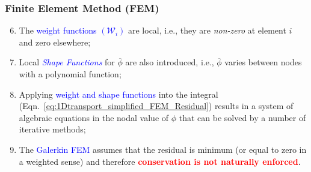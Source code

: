 \documentclass[10pt,compress,handout,ignorenonframetext]{beamer}
\begin{document}
 
\begin{frame}
 \frametitle{Finite Element Method (FEM)} 

\begin{enumerate}
   \setcounter{enumi}{5}
     \item <1-> The \textcolor{blue}{weight functions $\left(\mathcal{W}_{i}\right)$} are local, i.e., they are {\it non-zero} at element $i$ and zero elsewhere;
     \item <2-> Local \textcolor{blue}{\it Shape Functions} for $\overline{\phi}$ are also introduced, i.e., $\overline{\phi}$ varies between nodes with a polynomial function;
     \item <3-> Applying \textcolor{blue}{weight and shape functions} into the integral (Eqn.~\ref{eq:1Dtransport_simplified_FEM_Residual}) results in a system of algebraic equations in the nodal value of $\phi$ that can be solved by a number of iterative methods;
     \item <4-> The \textcolor{blue}{Galerkin FEM} assumes that the residual is minimum (or equal to zero in a weighted sense) and therefore \textcolor{red}{{\bf conservation is not naturally enforced}}.

\end{enumerate}  
 
\end{frame}
\end{document}
